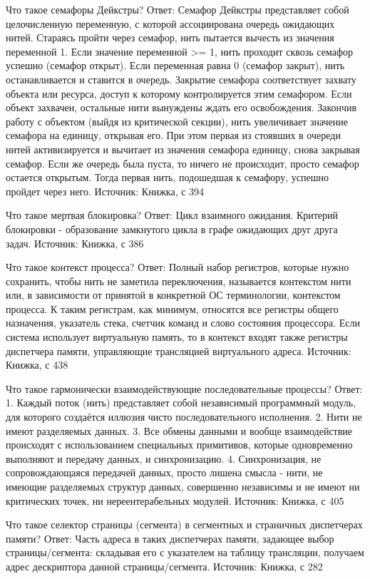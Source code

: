 \documentclass[russian,twocolumn]{article}
\begin{document}
Что такое семафоры Дейкстры?
Ответ: 
Семафор Дейкстры представляет собой целочисленную переменную, с которой ассоциирована очередь ожидающих нитей. Стараясь пройти через семафор, нить пытается вычесть из значения переменной 1. Если значение переменной >= 1, нить проходит сквозь семафор успешно (семафор открыт). Если переменная равна 0 (семафор закрыт), нить останавливается и ставится в очередь. 
Закрытие семафора соответствует захвату объекта или ресурса, доступ к которому контролируется этим семафором. Если объект захвачен, остальные нити вынуждены ждать его освобождения. Закончив работу с объектом (выйдя из критической секции), нить увеличивает значение семафора на единицу, открывая его. При этом первая из стоявших в очереди нитей активизируется и вычитает из значения семафора единицу, снова закрывая семафор. Если же очередь была пуста, то ничего не происходит, просто семафор остается открытым. Тогда первая нить, подошедшая к семафору, успешно пройдет через него. 
Источник: 
Книжка, с 394 

Что такое мертвая блокировка?
Ответ: 
Цикл взаимного ожидания. Критерий блокировки - образование замкнутого цикла в графе ожидающих друг друга задач. 
Источник: 
Книжка, с 386 

Что такое контекст процесса?
Ответ: 
Полный набор регистров, которые нужно сохранить, чтобы нить не заметила переключения, называется контекстом нити или, в зависимости от принятой в конкретной ОС терминологии, контекстом процесса. К таким регистрам, как минимум, относятся все регистры общего назначения, указатель стека, счетчик команд и слово состояния процессора. Если система использует виртуальную память, то в контекст входят также регистры диспетчера памяти, управляющие трансляцией виртуального адреса. 
Источник: 
Книжка, с 438 

Что такое гармонически взаимодействующие последовательные процессы?
Ответ: 
1. Каждый поток (нить) представляет собой независимый программный модуль, для которого создаётся иллюзия чисто последовательного исполнения. 
2. Нити не имеют разделяемых данных. 
3. Все обмены данными и вообще взаимодействие происходят с использованием специальных примитивов, которые одновременно выполняют и передачу данных, и синхронизацию. 
4. Синхронизация, не сопровождающаяся передачей данных, просто лишена смысла - нити, не имеющие разделяемых структур данных, совершенно независимы и не имеют ни критических точек, ни нереентерабельных модулей. 
Источник: 
Книжка, с 405 

Что такое селектор страницы (сегмента) в сегментных и страничных диспетчерах памяти?
Ответ: 
Часть адреса в таких диспетчерах памяти, задающее выбор страницы/сегмента: складывая его с указателем на таблицу трансляции, получаем адрес дескриптора данной страницы/сегмента. 
Источник: 
Книжка, с 282 
\end{document}

